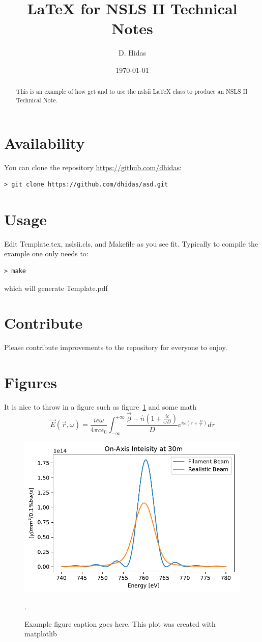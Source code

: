 \documentclass{nslsii}
\title{\LaTeX{}  for NSLS II Technical Notes}
\author{D. Hidas}
\date{\today}
\begin{document}
\maketitle

\begin{abstract}
This is an example of how get and to use the nslsii \LaTeX{} class to produce an NSLS II Technical Note.
\end{abstract}



\section{Availability}
You can clone the repository \href{https://github.com/dhidas}{https://github.com/dhidas}:
\begin{verbatim}
> git clone https://github.com/dhidas/asd.git
\end{verbatim}

\section{Usage}
Edit Template.tex, nslsii.cls, and Makefile as you see fit.  Typically to compile the example one only needs to:
\begin{verbatim}
> make
\end{verbatim}
which will generate Template.pdf


\section{Contribute}
Please contribute improvements to the repository for everyone to enjoy.


\section{Figures}
It is nice to throw in a figure such as figure~\ref{fig:example} and some math
$$
\vec E(\vec r, \omega) = \frac{ie\omega}{4 \pi c \epsilon_0} \int_{-\infty}^{+\infty} \frac{\vec \beta - \hat n (1 + \frac{i c}{ \omega D})}{D} e^{i \omega ( \tau + \frac{D}{c} )} d\tau
$$

\begin{figure}
\centering
\includegraphics[width=0.5\columnwidth]{img/spectra}
\caption{Example figure caption goes here.  This plot was created with matplotlib~\cite{bib:matplotlib}}.
\label{fig:example}
\end{figure}
\end{document}
